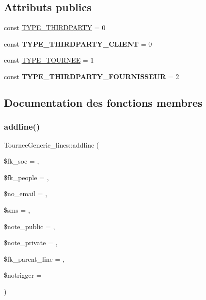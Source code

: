 \subsection*{Attributs publics}
\begin{DoxyCompactItemize}
\item 
const \hyperlink{classTourneeGeneric__lines_ab6566170b35cf9c3ad4e398fa511b2b4}{T\+Y\+P\+E\+\_\+\+T\+H\+I\+R\+D\+P\+A\+R\+TY} = 0
\item 
\mbox{\label{classTourneeGeneric__lines_aed8cbcadda2b109736ad83b0e3678505}} 
const {\bfseries T\+Y\+P\+E\+\_\+\+T\+H\+I\+R\+D\+P\+A\+R\+T\+Y\+\_\+\+C\+L\+I\+E\+NT} = 0
\item 
const \hyperlink{classTourneeGeneric__lines_ac658639b323adb3064c35250f9937f1a}{T\+Y\+P\+E\+\_\+\+T\+O\+U\+R\+N\+EE} = 1
\item 
\mbox{\label{classTourneeGeneric__lines_a8605185107858450a655ba1ff478988b}} 
const {\bfseries T\+Y\+P\+E\+\_\+\+T\+H\+I\+R\+D\+P\+A\+R\+T\+Y\+\_\+\+F\+O\+U\+R\+N\+I\+S\+S\+E\+UR} = 2
\end{DoxyCompactItemize}


\subsection{Documentation des fonctions membres}
\mbox{\label{classTourneeGeneric__lines_ac992484c22315c7eb13360699ddf8c12}} 
\subsubsection{\texorpdfstring{addline()}{addline()}}
{\footnotesize\ttfamily Tournee\+Generic\+\_\+lines\+::addline (\begin{DoxyParamCaption}\item[{}]{\$fk\+\_\+soc = {},  }\item[{}]{\$fk\+\_\+people = {},  }\item[{}]{\$no\+\_\+email = {},  }\item[{}]{\$sms = {},  }\item[{}]{\$note\+\_\+public = {\ttfamily \textquotesingle{}\textquotesingle{}},  }\item[{}]{\$note\+\_\+private = {\ttfamily \textquotesingle{}\textquotesingle{}},  }\item[{}]{\$fk\+\_\+parent\+\_\+line = {},  }\item[{}]{\$notrigger = {} }\end{DoxyParamCaption})}

